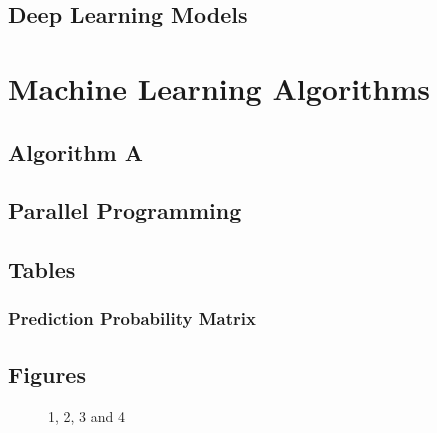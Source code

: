 \subsection{Deep Learning Models}

\section{Machine Learning Algorithms}

\subsection{Algorithm A}

\subsection{Parallel Programming}

\subsection{Tables}

\subsubsection{Prediction Probability Matrix}

\subsection{Figures}

\begin{figure}[H]
	\centering
	\begin{minipage}[b]{0.5\linewidth}
	\end{minipage}\hfill
	\begin{minipage}[b]{0.5\linewidth}
	\end{minipage}\hfill	
	\begin{minipage}[b]{0.5\linewidth}
	\end{minipage}\hfill
	\begin{minipage}[b]{0.5\linewidth}
	\end{minipage}\hfill
	\caption{1, 2, 3 and 4}
	\label{fig:Figure1}
\end{figure} 

